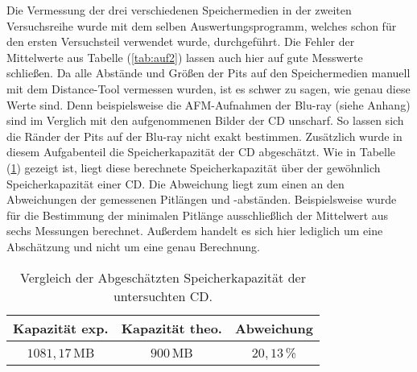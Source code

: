 \bigskip
Die Vermessung der drei verschiedenen Speichermedien in der zweiten Versuchsreihe wurde mit dem selben Auswertungsprogramm, welches schon f\"ur den ersten Versuchsteil verwendet wurde, durchgef\"uhrt.
Die Fehler der Mittelwerte aus Tabelle (\ref{tab:auf2}) lassen auch hier auf gute Messwerte schlie{\ss}en.
Da alle Abst\"ande und Gr\"o{\ss}en der Pits auf den Speichermedien manuell mit dem Distance-Tool vermessen wurden, ist es schwer zu sagen, wie genau diese Werte sind.
Denn beispielsweise die AFM-Aufnahmen der Blu-ray (siehe Anhang) sind im Verglich mit den aufgenommenen Bilder der CD unscharf.
So lassen sich die R\"ander der Pits auf der Blu-ray nicht exakt bestimmen.
Zus\"atzlich wurde in diesem Aufgabenteil die Speicherkapazit\"at der CD abgesch\"atzt.
Wie in Tabelle (\ref{tab:auf2_disk}) gezeigt ist, liegt diese berechnete Speicherkapazit\"at \"uber der gew\"ohnlich Speicherkapazit\"at einer CD.
Die Abweichung liegt zum einen an den Abweichungen der gemessenen Pitl\"angen und -abst\"anden.
Beispielsweise wurde f\"ur die Bestimmung der minimalen Pitl\"ange ausschlie{\ss}lich der Mittelwert aus sechs Messungen berechnet.
Au{\ss}erdem handelt es sich hier lediglich um eine Absch\"atzung und nicht um eine genau Berechnung.
\begin{table}
	\centering
	\caption{Vergleich der Abgesch\"atzten Speicherkapazit\"at der untersuchten CD.}
\begin{tabular}{|ccc|}
	\hline
	{Kapazit\"at exp.} & {Kapazit\"at theo.} & {Abweichung} \\
	\hline
	$1081,17 \,$MB & $900 \,$MB & $20,13 \,$\% \\
	\hline
\end{tabular}
\label{tab:auf2_disk}
\end{table}


